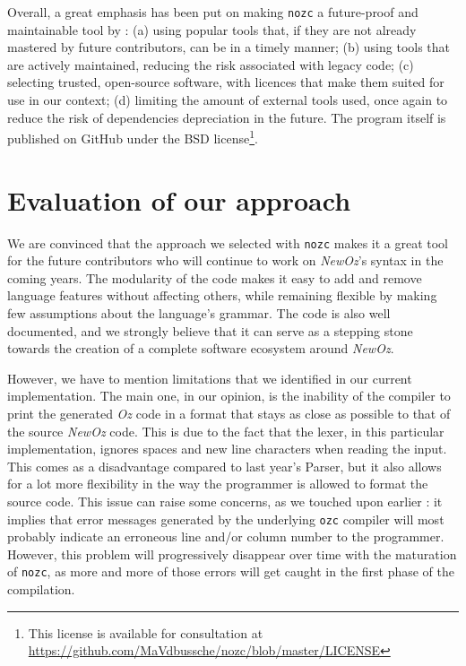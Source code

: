Overall, a great emphasis has been put on making \texttt{nozc} a future-proof and maintainable tool by : (a) using popular tools that, if they are not already mastered by future contributors, can be in a timely manner; (b) using tools that are actively maintained, reducing the risk associated with legacy code; (c) selecting trusted, open-source software, with licences that make them suited for use in our context; (d) limiting the amount of external tools used, once again to reduce the risk of dependencies depreciation in the future.\newline
The program itself is published on GitHub under the BSD license\footnote{This license is available for consultation at \url{https://github.com/MaVdbussche/nozc/blob/master/LICENSE}}.

\section{Evaluation of our approach}\label{sec:ch3-pros-cons}
We are convinced that the approach we selected with \texttt{nozc} makes it a great tool for the future contributors who will continue to work on \textit{NewOz}'s syntax in the coming years.
The modularity of the code makes it easy to add and remove language features without affecting others, while remaining flexible by making few assumptions about the language's grammar.
The code is also well documented, and we strongly believe that it can serve as a stepping stone towards the creation of a complete software ecosystem around \textit{NewOz}.\newline

However, we have to mention limitations that we identified in our current implementation.\newline
The main one, in our opinion, is the inability of the compiler to print the generated \textit{Oz} code in a format that stays as close as possible to that of the source \textit{NewOz} code.
This is due to the fact that the lexer, in this particular implementation, ignores spaces and new line characters when reading the input.
This comes as a disadvantage compared to last year's Parser, but it also allows for a lot more flexibility in the way the programmer is allowed to format the source code.
This issue can raise some concerns, as we touched upon earlier : it implies that error messages generated by the underlying \texttt{ozc} compiler will most probably indicate an erroneous line and/or column number to the programmer.
However, this problem will progressively disappear over time with the maturation of \texttt{nozc}, as more and more of those errors will get caught in the first phase of the compilation.\newline

